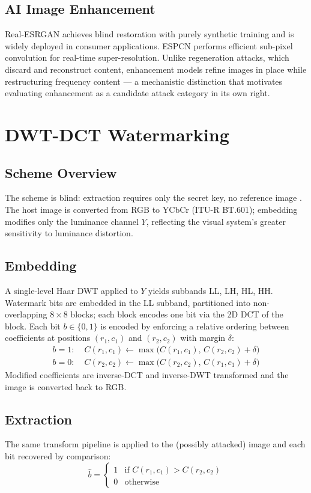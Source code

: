 \documentclass[conference]{IEEEtran}
\begin{document}
\subsection{AI Image Enhancement}
Real-ESRGAN \cite{realesrgan2021} achieves blind restoration with
purely synthetic training and is widely deployed in consumer
applications. ESPCN \cite{espcn2016} performs efficient sub-pixel
convolution for real-time super-resolution. Unlike regeneration
attacks, which discard and reconstruct content, enhancement models
refine images in place while restructuring frequency content --- a
mechanistic distinction that motivates evaluating enhancement as a
candidate attack category in its own right.

\section{DWT-DCT Watermarking}
\label{sec:background}

\subsection{Scheme Overview}
The scheme is blind: extraction requires only the secret key, no
reference image \cite{cox2007}. The host image is converted from RGB
to YCbCr (ITU-R BT.601); embedding modifies only the luminance channel
$Y$, reflecting the visual system's greater sensitivity to luminance
distortion.

\subsection{Embedding}
A single-level Haar DWT applied to $Y$ yields subbands LL, LH, HL, HH.
Watermark bits are embedded in the LL subband, partitioned into
non-overlapping $8\times8$ blocks; each block encodes one bit via the
2D DCT of the block. Each bit $b \in \{0,1\}$ is encoded by enforcing
a relative ordering between coefficients at positions $(r_1,c_1)$ and
$(r_2,c_2)$ with margin $\delta$:
\begin{align}
b=1:\; & C(r_1,c_1) \leftarrow \max\big(C(r_1,c_1),\, C(r_2,c_2)+\delta\big) \\
b=0:\; & C(r_2,c_2) \leftarrow \max\big(C(r_2,c_2),\, C(r_1,c_1)+\delta\big)
\end{align}
Modified coefficients are inverse-DCT and inverse-DWT transformed and
the image is converted back to RGB.

\subsection{Extraction}
The same transform pipeline is applied to the (possibly attacked)
image and each bit recovered by comparison:
\begin{equation}
\hat{b} =
\begin{cases}
1 & \text{if } C(r_1,c_1) > C(r_2,c_2) \\
0 & \text{otherwise}
\end{cases}
\end{equation}
\end{document}
